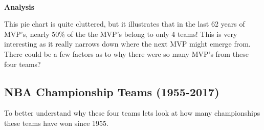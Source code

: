 \documentclass[11pt]{article}
\begin{document}
    \begin{center}
    \end{center}
    { \hspace*{\fill} \\}
    
    \textbf{Analysis} \newline

This pie chart is quite cluttered, but it illustrates that in the last
62 years of MVP's, nearly 50\% of the the MVP's belong to only 4 teams!
This is very interesting as it really narrows down where the next MVP
might emerge from. There could be a few factors as to why there were so
many MVP's from these four teams?

\subsection{NBA Championship Teams
(1955-2017)}\label{nba-championship-teams-1955-2017}

To better understand why these four teams lets look at how many
championships these teams have won since 1955.
\end{document}
